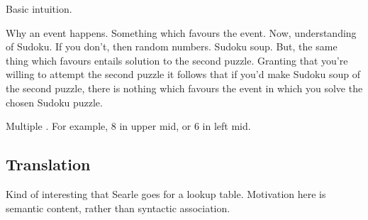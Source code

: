 \begin{note}
  Basic intuition.

  Why an event happens.
  Something which favours the event.
  Now, understanding of Sudoku.
  If you don't, then random numbers.
  Sudoku soup.
  But, the same thing which favours entails solution to the second puzzle.
  Granting that you're willing to attempt the second puzzle it follows that if you'd make Sudoku soup of the second puzzle, there is nothing which favours the event in which you solve the chosen Sudoku puzzle.
\end{note}


\begin{note}
  Multiple .
  For example, 8 in upper mid, or 6 in left mid.
\end{note}





\subsection{Translation}


\begin{note}
  Kind of interesting that Searle goes for a lookup table.
  Motivation here is semantic content, rather than syntactic association.
\end{note}


